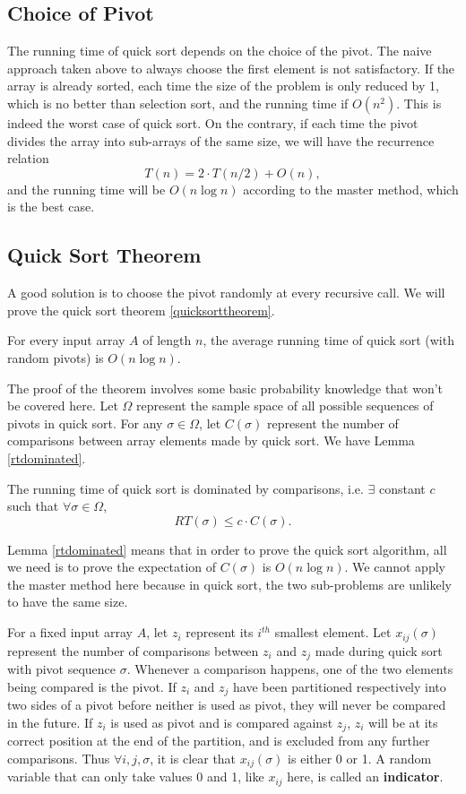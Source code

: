 \subsection{Choice of Pivot}
The running time of quick sort depends on the choice of the pivot. The naive approach taken above to always choose the first element is not satisfactory. If the array is already sorted, each time the size of the problem is only reduced by 1, which is no better than selection sort, and the running time if $O(n^2)$. This is indeed the worst case of quick sort. On the contrary, if each time the pivot divides the array into sub-arrays of the same size, we will have the recurrence relation 
\begin{equation*}
T(n)=2\cdot T(n/2)+O(n),
\end{equation*}
and the running time will be $O(n\log n)$ according to the master method, which is the best case. 
\subsection{Quick Sort Theorem}
A good solution is to choose the pivot randomly at every recursive call. We will prove the quick sort theorem \ref{quicksorttheorem}. 
\begin{theorem}\label{quicksorttheorem}
For every input array $A$ of length $n$, the average running time of quick sort (with random pivots) is $O(n\log n)$.
\end{theorem}
The proof of the theorem involves some basic probability knowledge that won't be covered here. Let $\Omega$ represent the sample space of all possible sequences of pivots in quick sort. For any $\sigma\in\Omega$, let $C(\sigma)$ represent the number of comparisons between array elements made by quick sort. We have Lemma \ref{rtdominated}.
\begin{lemma}\label{rtdominated}
The running time of quick sort is dominated by comparisons, i.e. $\exists$ constant $c$ such that $\forall\sigma\in\Omega$, 
$$RT(\sigma)\leq c\cdot C(\sigma).$$
\end{lemma}
Lemma \ref{rtdominated} means that in order to prove the quick sort algorithm, all we need is to prove the expectation of $C(\sigma)$ is $O(n\log n)$. We cannot apply the master method here because in quick sort, the two sub-problems are unlikely to have the same size. 

For a fixed input array $A$, let $z_i$ represent its $i^{th}$ smallest element. Let $x_{ij}(\sigma)$ represent the number of comparisons between $z_i$ and $z_j$ made during quick sort with pivot sequence $\sigma.$ Whenever a comparison happens, one of the two elements being compared is the pivot. If $z_i$ and $z_j$ have been partitioned respectively into two sides of a pivot before neither is used as pivot, they will never be compared in the future. If $z_i$ is used as pivot and is compared against $z_j$, $z_i$ will be at its correct position at the end of the partition, and is excluded from any further comparisons. Thus $\forall i,j,\sigma$, it is clear that $x_{ij}(\sigma)$ is either 0 or 1. A random variable that can only take values 0 and 1, like $x_{ij}$ here, is called an \textbf{indicator}. 

